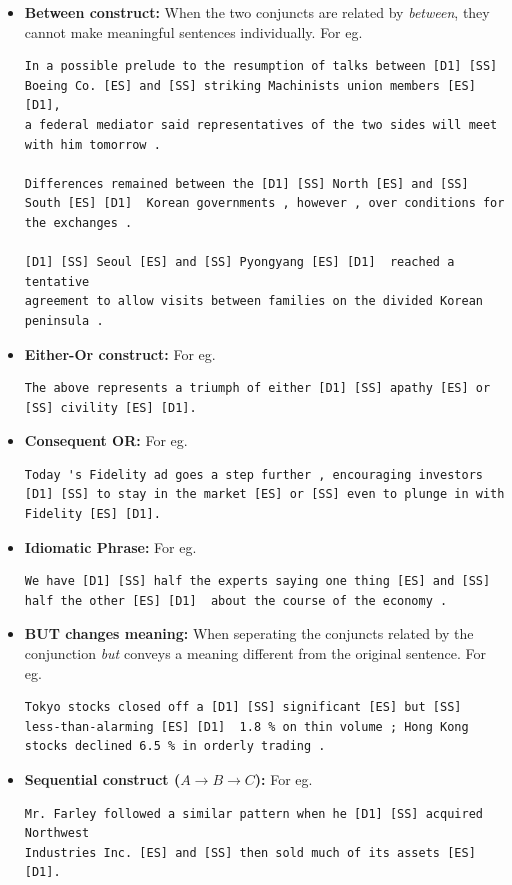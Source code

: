 \begin{itemize}
        \item \textbf{Between construct:} When the two conjuncts are related by \emph{between}, they cannot make meaningful sentences individually. For eg.
        \begin{verbatim}
In a possible prelude to the resumption of talks between [D1] [SS] 
Boeing Co. [ES] and [SS] striking Machinists union members [ES] [D1],
a federal mediator said representatives of the two sides will meet 
with him tomorrow .

Differences remained between the [D1] [SS] North [ES] and [SS] 
South [ES] [D1]  Korean governments , however , over conditions for 
the exchanges .

[D1] [SS] Seoul [ES] and [SS] Pyongyang [ES] [D1]  reached a tentative
agreement to allow visits between families on the divided Korean peninsula .        
        \end{verbatim}
        
        \item \textbf{Either-Or construct:} For eg.
        \begin{verbatim}
The above represents a triumph of either [D1] [SS] apathy [ES] or 
[SS] civility [ES] [D1].
        \end{verbatim}
        
        \item \textbf{Consequent OR:} For eg.
        \begin{verbatim}
Today 's Fidelity ad goes a step further , encouraging investors 
[D1] [SS] to stay in the market [ES] or [SS] even to plunge in with 
Fidelity [ES] [D1].
        \end{verbatim}

        \item \textbf{Idiomatic Phrase:} For eg.
        \begin{verbatim}
We have [D1] [SS] half the experts saying one thing [ES] and [SS]
half the other [ES] [D1]  about the course of the economy .
        \end{verbatim}
        
        \item \textbf{BUT changes meaning:} When seperating the conjuncts related by the conjunction \emph{but} conveys a meaning different from the original sentence. For eg.
        \begin{verbatim}
Tokyo stocks closed off a [D1] [SS] significant [ES] but [SS] 
less-than-alarming [ES] [D1]  1.8 % on thin volume ; Hong Kong 
stocks declined 6.5 % in orderly trading .
        \end{verbatim}

        \item \textbf{Sequential construct ($A \rightarrow B \rightarrow C$):} For eg.
        \begin{verbatim}
Mr. Farley followed a similar pattern when he [D1] [SS] acquired Northwest
Industries Inc. [ES] and [SS] then sold much of its assets [ES] [D1].
        \end{verbatim}
        
    \end{itemize}

